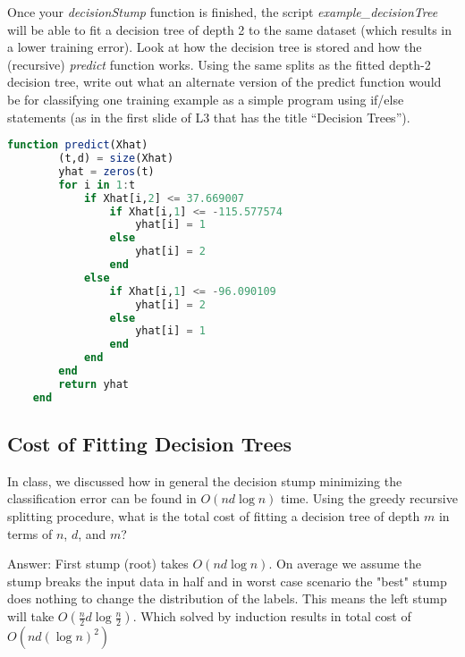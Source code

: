 \documentclass{article}
\def\ans#1{\par\gre{Answer: #1}}
\def\blu#1{{\color{blu}#1}}
\def\gre#1{{\color{gre}#1}}
\begin{document}
Once your \emph{decisionStump} function is finished, the script \emph{example\_decisionTree} will be able to fit a decision tree of depth 2 to the same dataset (which results in a lower training error). Look at how the decision tree is stored and how the (recursive) \emph{predict} function works. \blu{Using the same splits as the fitted depth-2 decision tree, write out what an alternate version of the predict function would be for classifying one training example as a simple program using if/else statements (as in the first slide of L3 that has the title ``Decision Trees'').}

\begin{lstlisting}[language=julia]
	function predict(Xhat)
		(t,d) = size(Xhat)
		yhat = zeros(t)
		for i in 1:t
			if Xhat[i,2] <= 37.669007
				if Xhat[i,1] <= -115.577574
					yhat[i] = 1
				else
					yhat[i] = 2
				end
			else
				if Xhat[i,1] <= -96.090109
					yhat[i] = 2
				else
					yhat[i] = 1
				end
			end
		end
		return yhat
	end
\end{lstlisting}

\subsection{Cost of Fitting Decision Trees}

In class, we discussed how in general the decision stump minimizing the classification error can be found in $O(nd\log n)$ time. Using the greedy recursive splitting procedure, \blu{what is the total cost of fitting a decision tree of depth $m$ in terms of $n$, $d$, and $m$?} 

\ans{
	First stump (root) takes $O(nd\log{n})$. On average we assume the stump breaks the input data in half and in worst case scenario the "best" stump does nothing to change the distribution of the labels. This means the left stump will take $O(\frac{n}{2}d\log{\frac{n}{2}})$. Which solved by induction results in total cost of $O(nd(\log{n})^2)$
}
\end{document}
